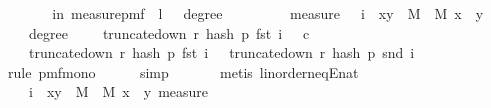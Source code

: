 \begin{isabellebody}
\ \ \isamarkupfalse%
\isanewline
\isanewline
\ \ \isamarkupfalse%
\ {\isachardoublequoteopen}{\isasymP}{\isacharparenleft}{\kern0pt}{\isasymomega}\ in\ measure{\isacharunderscore}{\kern0pt}pmf\ {\isasymOmega}{\isachardot}{\kern0pt}\ {\isacharquery}{\kern0pt}l\ {\isasymomega}\ {\isasymand}\ degree\ {\isasymomega}\ {\isasymge}\ {}{\isacharparenright}{\kern0pt}\ {\isasymle}\ \isanewline
\ \ \ \ measure\ {\isasymOmega}\ {\isacharparenleft}{\kern0pt}{\isasymUnion}\ i\ {\isasymin}\ {\isacharbraceleft}{\kern0pt}{\isacharparenleft}{\kern0pt}x{\isacharcomma}{\kern0pt}y{\isacharparenright}{\kern0pt}\ {\isasymin}\ M\ {\isasymtimes}\ M{\isachardot}{\kern0pt}\ x\ {\isacharless}{\kern0pt}\ y{\isacharbraceright}{\kern0pt}{\isachardot}{\kern0pt}\ {\isacharbraceleft}{\kern0pt}{\isasymomega}{\isachardot}{\kern0pt}\ \isanewline
\ \ \ \ degree\ {\isasymomega}\ {\isasymge}\ {}\ {\isasymand}\ truncate{\isacharunderscore}{\kern0pt}down\ r\ {\isacharparenleft}{\kern0pt}hash\ p\ {\isacharparenleft}{\kern0pt}fst\ i{\isacharparenright}{\kern0pt}\ {\isasymomega}{\isacharparenright}{\kern0pt}\ {\isasymle}\ c\ {\isasymand}\isanewline
\ \ \ \ truncate{\isacharunderscore}{\kern0pt}down\ r\ {\isacharparenleft}{\kern0pt}hash\ p\ {\isacharparenleft}{\kern0pt}fst\ i{\isacharparenright}{\kern0pt}\ {\isasymomega}{\isacharparenright}{\kern0pt}\ {\isacharequal}{\kern0pt}\ truncate{\isacharunderscore}{\kern0pt}down\ r\ {\isacharparenleft}{\kern0pt}hash\ p\ {\isacharparenleft}{\kern0pt}snd\ i{\isacharparenright}{\kern0pt}\ {\isasymomega}{\isacharparenright}{\kern0pt}{\isacharbraceright}{\kern0pt}{\isacharparenright}{\kern0pt}{\isachardoublequoteclose}\isanewline
\ \ \ \ \isamarkupfalse%
\ {\isacharparenleft}{\kern0pt}rule\ pmf{\isacharunderscore}{\kern0pt}mono{\isacharunderscore}{\kern0pt}{}{\isacharparenright}{\kern0pt}\isanewline
\ \ \ \ \isamarkupfalse%
\ {\isacharparenleft}{\kern0pt}simp{\isacharparenright}{\kern0pt}\ \isanewline
\ \ \ \ \isamarkupfalse%
\ {\isacharparenleft}{\kern0pt}metis\ linorder{\isacharunderscore}{\kern0pt}neqE{\isacharunderscore}{\kern0pt}nat{\isacharparenright}{\kern0pt}\isanewline
\ \ \isamarkupfalse%
\ \isamarkupfalse%
\ {\isachardoublequoteopen}{\isachardot}{\kern0pt}{\isachardot}{\kern0pt}{\isachardot}{\kern0pt}\ {\isasymle}\ {\isacharparenleft}{\kern0pt}{\isasymSum}\ i\ {\isasymin}\ {\isacharbraceleft}{\kern0pt}{\isacharparenleft}{\kern0pt}x{\isacharcomma}{\kern0pt}y{\isacharparenright}{\kern0pt}\ {\isasymin}\ M\ {\isasymtimes}\ M{\isachardot}{\kern0pt}\ x\ {\isacharless}{\kern0pt}\ y{\isacharbraceright}{\kern0pt}{\isachardot}{\kern0pt}\ measure\ {\isasymOmega}\ \isanewline

\end{isabellebody}
